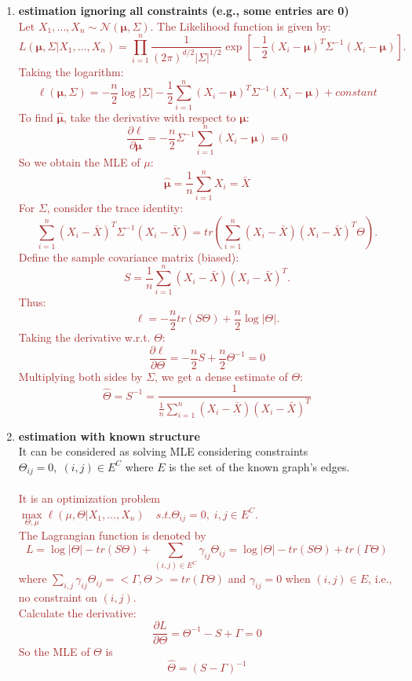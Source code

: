 \documentclass[12pt]{book}
\theoremstyle{definition}
\theoremstyle{remark}
\begin{document}
\begin{enumerate}
    \item \textbf{estimation ignoring all constraints (e.g., some entries are 0)}\\
    \textcolor{brown}{
    Let \( X_1, \dots, X_n \sim \mathcal{N}(\bm{\mu}, \Sigma) \).
The Likelihood function is given by:
\[
L(\bm{\mu}, \Sigma |X_1, \dots, X_n ) =
\prod_{i=1}^{n} \frac{1}{(2\pi)^{d/2} |\Sigma|^{1/2}} 
\exp \left[ -\frac{1}{2} (X_i - \bm{\mu})^T \Sigma^{-1} (X_i - \bm{\mu}) \right].
\]
Taking the logarithm:
\[
\ell(\bm{\mu}, \Sigma) = - \frac{n}{2} \log |\Sigma| 
- \frac{1}{2} \sum_{i=1}^{n} (X_i - \bm{\mu})^T \Sigma^{-1} (X_i - \bm{\mu})+constant
\]
To find \( \hat{\bm{\mu}} \), take the derivative with respect to \( \bm{\mu} \):
\[\frac{\partial \ell}{\partial \bm{\mu}} = -\frac{n}{2} \Sigma^{-1} \sum_{i=1}^{n} (X_i - \bm{\mu}) = 0\]
So we obtain the MLE of $\mu$:
\[\hat{\bm{\mu}} = \frac{1}{n} \sum_{i=1}^{n} X_i = \bar{X}\]
For \( \Sigma \), consider the trace identity:
\[
\sum_{i=1}^{n} (X_i - \bar{X})^T \Sigma^{-1} (X_i - \bar{X})
= tr \left( \sum_{i=1}^{n} (X_i - \bar{X})(X_i - \bar{X})^T \Theta \right).
\]
Define the sample covariance matrix (biased):
\[
S = \frac{1}{n} \sum_{i=1}^{n} (X_i - \bar{X})(X_i - \bar{X})^T.
\]
Thus:
\[
\ell = -\frac{n}{2} tr ( S \Theta ) + \frac{n}{2} \log |\Theta|.
\]
Taking the derivative w.r.t. \( \Theta \):
\[
\frac{\partial \ell}{\partial \Theta} = - \frac{n}{2}S + \frac{n}{2} \Theta^{-1}  = 0
\]
Multiplying both sides by \( \Sigma \), we get a dense estimate of $\Theta$:
\[\hat{\Theta} = S^{-1} = \frac{1}{\frac{1}{n} \sum_{i=1}^{n} (X_i - \bar{X})(X_i - \bar{X})^T}\]
}

\item \textbf{estimation with known structure}\\
It can be considered as solving MLE considering constraints $\Theta_{ij} = 0, \; (i,j)\in E^C$ where $E$ is the set of the known graph's edges.\\
\\
\textcolor{brown}{
It is an optimization problem $\underset{\Theta, \mu}{\max} \ell (\mu, \Theta| X_1, \dots, X_n) \quad s.t. \Theta_{ij} = 0, \; i,j\in E^C$.\\
The Lagrangian function is denoted by 
\[L = \log|\Theta| - tr(S\Theta)+\sum_{(i,j)\in E^C}\gamma_{ij}\Theta_{ij} = \log|\Theta| - tr(S\Theta)+tr(\Gamma\Theta)\]
where $\sum_{i,j}\gamma_{ij}\Theta_{ij} = <\Gamma, \Theta> = tr(\Gamma\Theta)$ and $\gamma_{ij} = 0 $ when $(i,j)\in E$, i.e., no constraint on $(i,j)$.\\
Calculate the derivative:
\[\frac{\partial L}{\partial \Theta} = \Theta^{-1} - S + \Gamma = 0\]
So the MLE of $\Theta$ is \[\hat{\Theta} = (S-\Gamma)^{-1}\]
}



\end{enumerate}
\end{document}
